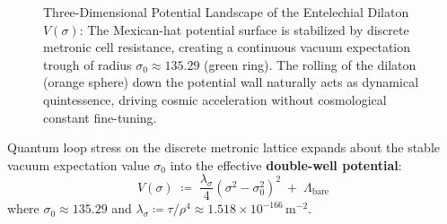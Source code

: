 \documentclass[
    12pt,
    a4paper,
    headings=normal,
    twoside=false,
    open=any,
    parskip=half
]{scrbook}
\begin{document}
\begin{figure}[htbp]
\caption{Three-Dimensional Potential Landscape of the Entelechial Dilaton $V(\sigma)$: The Mexican-hat potential surface is stabilized by discrete metronic cell resistance, creating a continuous vacuum expectation trough of radius $\sigma_0 \approx 135.29$ (green ring). The rolling of the dilaton (orange sphere) down the potential wall naturally acts as dynamical quintessence, driving cosmic acceleration without cosmological constant fine-tuning.}
\label{fig:ch2_entelechial_potential_3d}
\end{figure}

\begin{phystheorem}\label{thm:ch2_entelechial_potential_formula}
Quantum loop stress on the discrete metronic lattice expands about the stable vacuum expectation value $\sigma_0$ into the effective \textbf{double-well potential}:
\begin{equation}
\boxed{V(\sigma) \;\coloneqq\; \frac{\lambda_\sigma}{4}\left( \sigma^2 - \sigma_0^2 \right)^2 \;+\; \Lambda_{\text{bare}}}
\label{eq:ch2_entelechial_potential_formula}
\end{equation}
where $\sigma_0 \approx 135.29$ and $\lambda_\sigma \coloneqq \tau/\rho^4 \approx 1.518 \times 10^{-166}\,\text{m}^{-2}$.
\end{phystheorem}
\end{document}
